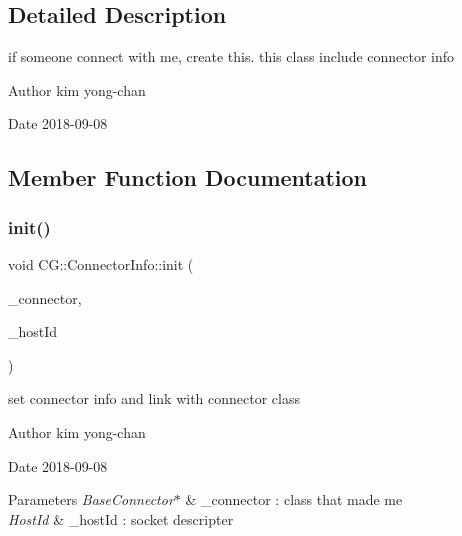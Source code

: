 \subsection{Detailed Description}
if someone connect with me, create this. this class include connector info 

\begin{DoxyAuthor}{Author}
kim yong-\/chan 
\end{DoxyAuthor}
\begin{DoxyDate}{Date}
2018-\/09-\/08 
\end{DoxyDate}


\subsection{Member Function Documentation}
\mbox{\label{class_c_g_1_1_connector_info_ae8e3cecb2e65164b357cab6ad7d60ba2}} 
\subsubsection{\texorpdfstring{init()}{init()}}
{\footnotesize\ttfamily void C\+G\+::\+Connector\+Info\+::init (\begin{DoxyParamCaption}\item[{\mbox{\hyperlink{class_c_g_1_1_base_connector}{Base\+Connector}} $\ast$}]{\+\_\+connector,  }\item[{Host\+Id}]{\+\_\+host\+Id }\end{DoxyParamCaption})\hspace{0.3cm}{\ttfamily [protected]}}



set connector info and link with connector class 

\begin{DoxyAuthor}{Author}
kim yong-\/chan 
\end{DoxyAuthor}
\begin{DoxyDate}{Date}
2018-\/09-\/08 
\end{DoxyDate}

\begin{DoxyParams}{Parameters}
{\em Base\+Connector$\ast$} & \+\_\+connector \+: class that made me \\
\hline
{\em Host\+Id} & \+\_\+host\+Id \+: socket descripter \\
\hline
\end{DoxyParams}
\mbox{\label{class_c_g_1_1_connector_info_af6b5c51df589176c6cb3dc093deabfae}} 
